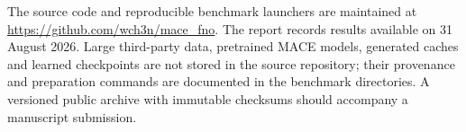 \documentclass[11pt]{article}
\begin{document}
The source code and reproducible benchmark launchers are maintained at
\url{https://github.com/wch3n/mace_fno}. The report records results available
on 31 August 2026. Large third-party data, pretrained MACE models, generated
caches and learned checkpoints are not stored in the source repository;
their provenance and preparation commands are documented in the benchmark
directories. A versioned public archive with immutable checksums should
accompany a manuscript submission.



\end{document}
